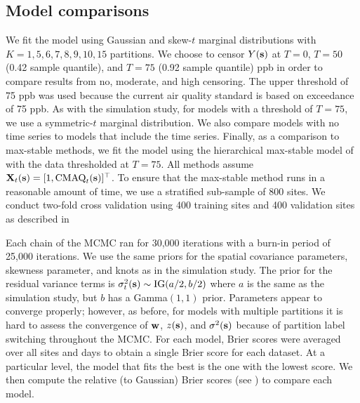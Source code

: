 \documentclass[useAMS,usenatbib,referee]{biom}
\begin{document}

\subsection{Model comparisons}
We fit the model using Gaussian and skew-$t$ marginal distributions with $K=1, 5, 6, 7, 8, 9, 10, 15$ partitions.
We choose to censor $Y(\mbox{\bf s})$ at $T = 0$, $T = 50$ (0.42 sample quantile), and $T = 75$ (0.92 sample quantile) ppb in order to compare results from no, moderate, and high censoring.
The upper threshold of 75 ppb was used because the current air quality standard is based on exceedance of 75 ppb.
As with the simulation study, for models with a threshold of $T = 75$, we use a symmetric-$t$ marginal distribution.
We also compare models with no time series to models that include the time series.
Finally, as a comparison to max-stable methods, we fit the model using the hierarchical max-stable model of \citet{Reich2012} with the data thresholded at $T = 75$.
All methods assume $\mbox{\bf X}_t(\mbox{\bf s}) = [1, \text{CMAQ}_t(\mbox{\bf s})]^\top$.
To ensure that the max-stable method runs in a reasonable amount of time, we use a stratified sub-sample of 800 sites.
We conduct two-fold cross validation using 400 training sites and 400 validation sites as described in 

Each chain of the MCMC ran for 30,000 iterations with a burn-in period of 25,000 iterations.
We use the same priors for the spatial covariance parameters, skewness parameter, and knots as in the simulation study.
The prior for the residual variance terms is $\sigma^2_t(\mbox{\bf s}) \sim \text{IG}(a / 2, b / 2)$ where $a$ is the same as the simulation study, but $b$ has a Gamma$(1, 1)$ prior.
Parameters appear to converge properly; however, as before, for models with multiple partitions it is hard to assess the convergence of $\mbox{\bf w}$, $z(\mbox{\bf s})$, and $\sigma^2(\mbox{\bf s})$ because of partition label switching throughout the MCMC.
For each model, Brier scores were averaged over all sites and days to obtain a single Brier score for each dataset.
At a particular level, the model that fits the best is the one with the lowest score.
We then compute the relative (to Gaussian) Brier scores (see ) to compare each model.
\end{document}
